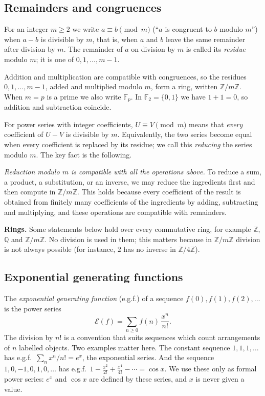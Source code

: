 \documentclass[11pt,a4paper]{article}
\theoremstyle{definition}
\theoremstyle{remark}
\newcommand{\Z}{\mathbb{Z}}
\newcommand{\Q}{\mathbb{Q}}
\newcommand{\F}{\mathbb{F}}
\newcommand{\para}[1]{\par\medskip\noindent\textbf{#1}\enspace}
\begin{document}
\subsection{Remainders and congruences}
For an integer $m\ge2$ we write $a\equiv b\pmod m$ (``$a$ is congruent to $b$ modulo $m$'') when $a-b$ is divisible by
$m$, that is, when $a$ and $b$ leave the same remainder after division by $m$. The remainder of $a$ on division by
$m$ is called its \emph{residue} modulo $m$; it is one of $0,1,\dots,m-1$.

Addition and multiplication are compatible with congruences, so the residues $0,1,\dots,m-1$, added and multiplied
modulo $m$, form a ring, written $\Z/m\Z$. When $m=p$ is a prime we also write $\F_p$. In $\F_2=\{0,1\}$ we have $1+1=0$,
so addition and subtraction coincide.

For power series with integer coefficients, $U\equiv V\pmod m$ means that \emph{every} coefficient of $U-V$ is
divisible by $m$. Equivalently, the two series become equal when every coefficient is replaced by its residue; we call
this \emph{reducing} the series modulo $m$. The key fact is the following.

\emph{Reduction modulo $m$ is compatible with all the operations above.} To reduce a sum, a product, a substitution, or
an inverse, we may reduce the ingredients first and then compute in $\Z/m\Z$. This holds because every
coefficient of the result is obtained from finitely many coefficients of the ingredients by adding, subtracting and
multiplying, and these operations are compatible with remainders.

\para{Rings.} Some statements below hold over every commutative ring, for example $\Z$, $\Q$ and $\Z/m\Z$. No
division is used in them; this matters because in $\Z/m\Z$ division is not always possible (for instance, $2$ has no inverse in
$\Z/4\Z$).

\subsection{Exponential generating functions}
The \emph{exponential generating function} (e.g.f.) of a sequence $f(0),f(1),f(2),\dots$ is the power series
\[
\mathcal E(f)=\sum_{n\ge0}f(n)\,\frac{x^n}{n!}.
\]
The division by $n!$ is a convention that suits sequences which count arrangements of $n$ labelled objects. Two
examples matter here. The
constant sequence $1,1,1,\dots$ has e.g.f.\ $\sum_nx^n/n!=e^x$, the exponential series. And the sequence $1,0,-1,0,1,0,\dots$
has e.g.f.\ $1-\frac{x^2}{2!}+\frac{x^4}{4!}-\cdots=\cos x$. We use these only as formal power series: $e^x$ and
$\cos x$ are defined by these series, and $x$ is never given a value.
\end{document}
